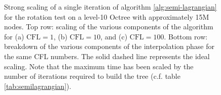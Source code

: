 \begin{figure}[htbp]
\begin{center}
	\end{center}
	\caption{Strong scaling of a single iteration of algorithm \ref{alg:semi-lagrangian} for the rotation test on a level-10 Octree with approximately 15M nodes. Top row: scaling of the various components of the algorithm for (a) $\text{CFL} = 1$, (b) $\text{CFL} = 10$, and (c) $\text{CFL} = 100$. Bottom row: breakdown of the various components of the interpolation phase for the same CFL numbers. The solid dashed line represents the ideal scaling. Note that the maximum time has been scaled by the number of iterations required to build the tree (c.f. table \ref{tab:semilagrangian}).}
	\label{fig:semilagrangian_small}
\end{figure}

